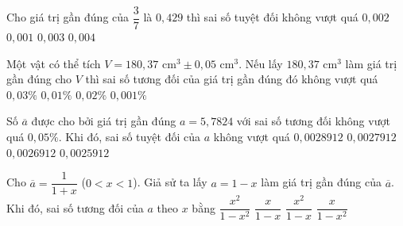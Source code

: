 \begin{ex}
	Cho giá trị gần đúng của $\dfrac{3}{7}$ là $0{,}429$ thì sai số tuyệt đối không vượt quá
	\choice
	{$0{,}002$}
	{\True $0{,}001$}
	{$0{,}003$}
	{$0{,}004$}
\end{ex}

\begin{ex}
	Một vật có thể tích $V = 180{,}37\text{ cm}^3 \pm 0{,}05\text{ cm}^3$. Nếu lấy $180{,}37\text{ cm}^3$ làm giá trị gần đúng cho $V$ thì sai số tương đối của giá trị gần đúng đó không vượt quá
	\choice
	{\True $0{,}03\%$}
	{$0{,}01\%$}
	{$0{,}02\%$}
	{$0{,}001\%$}
\end{ex}

\begin{ex}
	Số $\overline{a}$ được cho bởi giá trị gần đúng $a = 5{,}7824$ với sai số tương đối không vượt quá $0{,}05\%$. Khi đó, sai số tuyệt đối của $a$ không vượt quá
	\choice
	{\True $0{,}0028912$}
	{$0{,}0027912$}
	{$0{,}0026912$}
	{$0{,}0025912$}
\end{ex}

\begin{ex}
	Cho $\overline{a} = \dfrac{1}{1 + x}$ ($0 < x < 1$). Giả sử ta lấy $a = 1 - x$ làm giá trị gần đúng của $\overline{a}$. Khi đó, sai số tương đối của $a$ theo $x$ bằng
	\choice
	{\True $\dfrac{x^2}{1 - x^2}$}
	{$\dfrac{x}{1 - x}$}
	{$\dfrac{x^2}{1 - x}$}
	{$\dfrac{x}{1 - x^2}$}
\end{ex}

